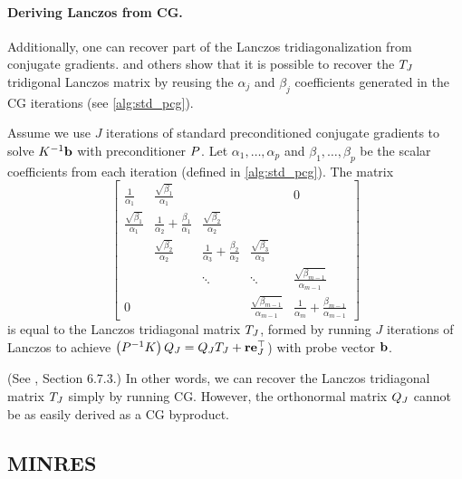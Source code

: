 \paragraph{Deriving Lanczos from CG.}
Additionally, one can recover part of the Lanczos tridiagonalization from conjugate gradients.
\citet{saad2003iterative} and others show that it is possible to recover the $T_J$ tridigonal Lanczos matrix by {reusing the $\alpha_j$ and $\beta_j$ coefficients} generated in the CG iterations (see \cref{alg:std_pcg}).
%
\begin{observation}
  Assume we use $J$ iterations of standard preconditioned conjugate gradients to solve $K^{-1} \mathbf{b}$ with preconditioner $P$.
  Let $\alpha_1, \ldots, \alpha_p$ and $\beta_1, \ldots, \beta_p$ be the scalar coefficients from each iteration (defined in \cref{alg:std_pcg}).
  The matrix
  \begin{equation*}
    \left[\begin{array}{ccccc}
      \frac{1}{\alpha_1} & \frac{\sqrt{\beta_1}}{\alpha_1} &  & & 0 \\
      \frac{\sqrt{\beta_1}}{\alpha_1} & \frac{1}{\alpha_2} + \frac{\beta_1}{\alpha_1} & \frac{\sqrt{\beta_2}}{\alpha_2} &  &  \\
      & \frac{\sqrt{\beta_2}}{\alpha_2} & \frac{1}{\alpha_3} + \frac{\beta_2}{\alpha_2} & \frac{\sqrt{\beta_3}}{\alpha_3} &  \\
      &       & \ddots & \ddots & \frac{\sqrt{\beta_{m-1}}}{\alpha_{m-1}} \\
      0 &       &        & \frac{\sqrt{\beta_{m-1}}}{\alpha_{m-1}} & \frac{1}{\alpha_m} + \frac{\beta_{m-1}}{\alpha_{m-1}}
    \end{array}\right]
  \end{equation*}
  is equal to the Lanczos tridiagonal matrix $T_J$, formed by running $J$ iterations of Lanczos to achieve $\left( P^{-1} K \right) Q_J = Q_J T_J + \mathbf{r} \mathbf{e}_{J}^{\top}$) with probe vector $\mathbf{b}$.
  \label{obs:lanczos_cg}
\end{observation}
%
\noindent
(See \cite{saad2003iterative}, Section 6.7.3.)
In other words, we can recover the Lanczos tridiagonal matrix $T_J$ simply by running CG.
However, the orthonormal matrix $Q_J$ cannot be as easily derived as a CG byproduct.


\subsection{MINRES}
\label{sec:minres}

